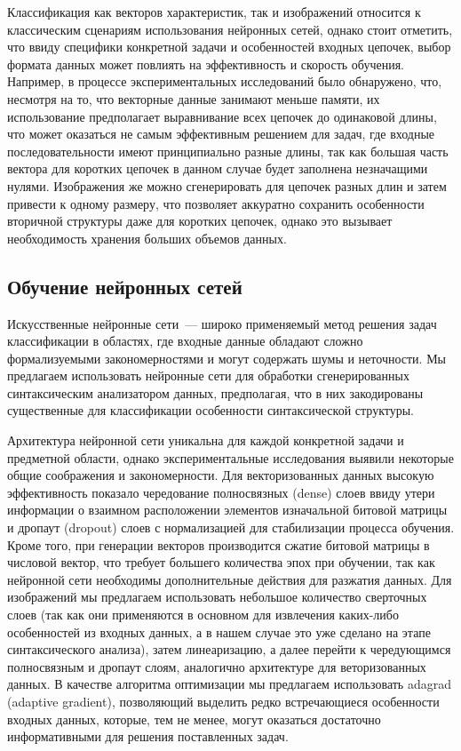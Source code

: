 Классификация как векторов характеристик, так и изображений относится к классическим сценариям использования нейронных сетей, однако стоит отметить, что ввиду специфики конкретной задачи и особенностей входных цепочек, выбор формата данных может повлиять на эффективность и скорость обучения. Например, в процессе экспериментальных исследований было обнаружено, что, несмотря на то, что векторные данные занимают меньше памяти, их использование предполагает выравнивание всех цепочек до одинаковой длины, что может оказаться не самым эффективным решением для задач, где входные последовательности имеют принципиально разные длины, так как большая часть вектора для коротких цепочек в данном случае будет заполнена незначащими нулями. Изображения же можно сгенерировать для цепочек разных длин и затем привести к одному размеру, что позволяет аккуратно сохранить особенности вторичной структуры даже для коротких цепочек, однако это вызывает необходимость хранения больших объемов данных.

\subsection{Обучение нейронных сетей}
Искусственные нейронные сети~--- широко применяемый метод решения задач классификации в областях, где входные данные обладают сложно формализуемыми закономерностями и могут содержать шумы и неточности. Мы предлагаем использовать нейронные сети для обработки сгенерированных синтаксическим анализатором данных, предполагая, что в них закодированы существенные для классификации особенности синтаксической структуры.

Архитектура нейронной сети уникальна для каждой конкретной задачи и предметной области, однако экспериментальные исследования выявили некоторые общие соображения и закономерности. Для векторизованных данных высокую эффективность показало чередование полносвязных (dense) слоев ввиду утери информации о взаимном расположении элементов изначальной битовой матрицы и дропаут (dropout) слоев с нормализацией для стабилизации процесса обучения. Кроме того, при генерации векторов производится сжатие битовой матрицы в числовой вектор, что требует большего количества эпох при обучении, так как нейронной сети необходимы дополнительные действия для разжатия данных. Для изображений мы предлагаем использовать небольшое количество сверточных слоев (так как они применяются в основном для извлечения каких-либо особенностей из входных данных, а в нашем случае это уже сделано на этапе синтаксического анализа), затем линеаризацию, а далее перейти к чередующимся полносвязным и дропаут слоям, аналогично архитектуре для веторизованных данных. В качестве алгоритма оптимизации мы предлагаем использовать adagrad (adaptive gradient), позволяющий выделить редко встречающиеся особенности входных данных, которые, тем не менее, могут оказаться достаточно информативными для решения поставленных задач.

